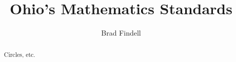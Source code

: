 \documentclass[numbers,nooutcomes,twoside,hints]{xourse}
\title{Ohio's Mathematics Standards}
\author{Brad Findell}
\begin{document}
\begin{abstract}
Circles, etc.
\end{abstract}
\maketitle





\end{document}
